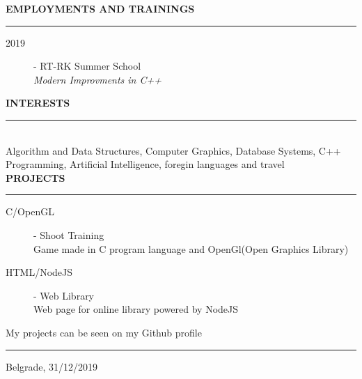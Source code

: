 \documentclass{article}
\begin{document}
\textbf{\large EMPLOYMENTS AND TRAININGS}\\
\color{my_col}\noindent\rule{15.4cm}{0.6pt}\color{black}
\begin{description}
    \item[ 2019] - RT-RK Summer School \\
    \textit{Modern Improvments in C++}
   
\end{description}

\textbf{\large INTERESTS}\\
\color{my_col}\noindent\rule{15.4cm}{0.6pt}\color{black}\\
Algorithm and Data Structures, Computer Graphics, Database Systems, 
C++ Programming, Artificial Intelligence, foregin languages and travel\\

\textbf{\large PROJECTS}\\
\color{my_col}\noindent\rule{15.4cm}{0.6pt}\color{black}
\begin{description}
    \item[ C/OpenGL] - Shoot Training\\ 
    Game made in C program language and OpenGl(Open Graphics Library)
    \item[ HTML/NodeJS] - Web Library\\ 
    Web page for online library powered by NodeJS
\end{description}
My projects can be seen on my Github profile \\

\color{my_col}\noindent\rule{15.4cm}{0.6pt}\color{black}
\begin{flushright}
	\small Belgrade, 31/12/2019
\end{flushright}
\end{document}
